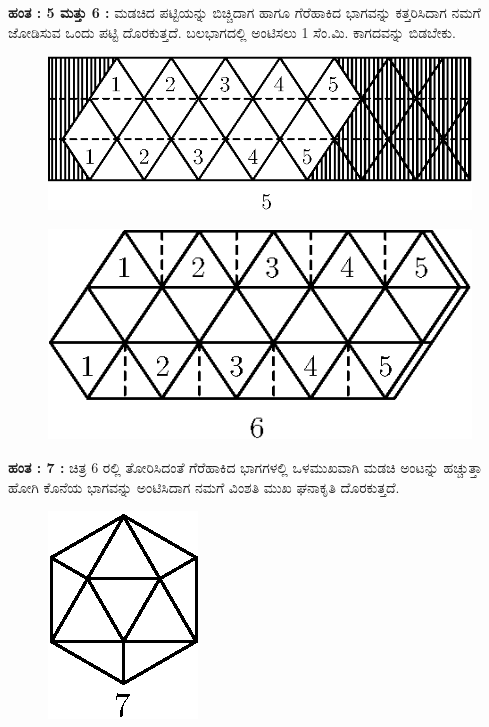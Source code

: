 \begin{enumerate}
 \textbf{ಹಂತ : 5 ಮತ್ತು 6 :} ಮಡಚಿದ ಪಟ್ಟಿಯನ್ನು ಬಿಚ್ಚಿದಾಗ ಹಾಗೂ ಗೆರೆಹಾಕಿದ ಭಾಗವನ್ನು ಕತ್ತರಿಸಿದಾಗ ನಮಗೆ ಜೋಡಿಸುವ ಒಂದು ಪಟ್ಟಿ ದೊರಕುತ್ತದೆ. ಬಲಭಾಗದಲ್ಲಿ ಅಂಟಿಸಲು 1 ಸೆಂ.ಮಿ. ಕಾಗದವನ್ನು ಬಿಡಬೇಕು.  
 \begin{figure}[H]
\centering
\includegraphics[scale=.98]{src/figure/chap1/fig1-22c.eps}
\end{figure}
\begin{figure}[H]
\centering
\includegraphics[scale=.98]{src/figure/chap1/fig1-22d.eps}
\end{figure}
 
 \textbf{ಹಂತ : 7 : } ಚಿತ್ರ 6 ರಲ್ಲಿ ತೋರಿಸಿದಂತೆ ಗೆರೆಹಾಕಿದ ಭಾಗಗಳಲ್ಲಿ ಒಳಮುಖವಾಗಿ ಮಡಚಿ ಅಂಟನ್ನು ಹಚ್ಚುತ್ತಾ ಹೋಗಿ ಕೊನೆಯ ಭಾಗವನ್ನು ಅಂಟಿಸಿದಾಗ ನಮಗೆ ವಿಂಶತಿ ಮುಖ ಘನಾಕೃತಿ ದೊರಕುತ್ತದೆ.  
 \begin{figure}[H]
\centering
\includegraphics[scale=.98]{src/figure/chap1/fig1-22e.eps}\\
\end{figure}
 
 \end{enumerate}
 
